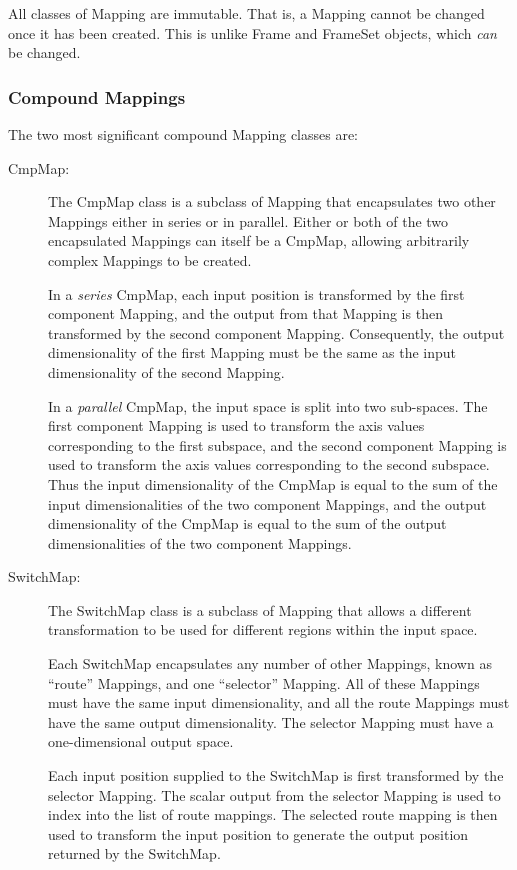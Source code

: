 \documentclass[final,authoryear,5p,times,twocolumn]{elsarticle}
\begin{document}
All classes of Mapping are immutable. That is, a Mapping cannot be changed
once it has been created. This is unlike Frame and FrameSet objects, which
\emph{can} be changed.

\subsubsection{Compound Mappings}
\label{sec:cmpmap}

The two most significant compound Mapping classes are:

\begin{description}
\item[CmpMap:]  The CmpMap class is a subclass of Mapping that encapsulates
two other Mappings either in series or in parallel. Either or both of the two
encapsulated Mappings can itself be a CmpMap, allowing arbitrarily complex
Mappings to be created.

In a \emph{series} CmpMap, each input position is transformed by the
first component Mapping, and the output from that Mapping is then
transformed by the second component Mapping. Consequently, the output
dimensionality of the first Mapping must be the same as the input
dimensionality of the second Mapping.

In a \emph{parallel} CmpMap, the input space is split into two sub-spaces.
The first component Mapping is used to transform the axis values
corresponding to the first subspace, and the second component Mapping is
used to transform the axis values corresponding to the second subspace.
Thus the input dimensionality of the CmpMap is equal to the sum of the
input dimensionalities of the two component Mappings, and the output
dimensionality of the CmpMap is equal to the sum of the output
dimensionalities of the two component Mappings.

\item[SwitchMap:] The SwitchMap class is a subclass of Mapping that allows
a different transformation to be used for different regions within the input
space.

Each SwitchMap encapsulates any number of other Mappings, known as ``route''
Mappings, and one ``selector'' Mapping. All of these Mappings must have the
same input dimensionality, and all the route Mappings must have the same
output dimensionality. The selector Mapping must have a one-dimensional
output space.

Each input position supplied to the SwitchMap is first transformed by the
selector Mapping. The scalar output from the selector Mapping is used to
index into the list of route mappings. The selected route mapping is then
used to transform the input position to generate the output position
returned by the SwitchMap.


\end{description}
\end{document}
